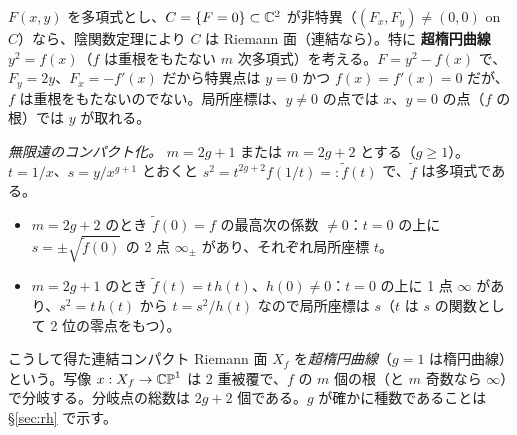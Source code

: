 \begin{ex}[平面曲線と超楕円曲線]\label{ex:hyper}
$F(x,y)$ を多項式とし、$C=\{F=0\}\subset\mathbb C^2$ が非特異（$(F_x,F_y)\ne(0,0)$ on $C$）なら、陰関数定理により $C$ は Riemann 面（連結なら）。特に \textbf{超楕円曲線} $y^2=f(x)$（$f$ は重根をもたない $m$ 次多項式）を考える。$F=y^2-f(x)$ で、$F_y=2y$、$F_x=-f'(x)$ だから特異点は $y=0$ かつ $f(x)=f'(x)=0$ だが、$f$ は重根をもたないのでない。局所座標は、$y\ne0$ の点では $x$、$y=0$ の点（$f$ の根）では $y$ が取れる。

\emph{無限遠のコンパクト化。} $m=2g+1$ または $m=2g+2$ とする（$g\ge1$）。$t=1/x$、$s=y/x^{g+1}$ とおくと $s^2=t^{2g+2}f(1/t)=:\tilde f(t)$ で、$\tilde f$ は多項式である。
\begin{itemize}
\item $m=2g+2$ のとき $\tilde f(0)=f$ の最高次の係数 $\ne0$：$t=0$ の上に $s=\pm\sqrt{\tilde f(0)}$ の 2 点 $\infty_\pm$ があり、それぞれ局所座標 $t$。
\item $m=2g+1$ のとき $\tilde f(t)=t\,h(t)$、$h(0)\ne0$：$t=0$ の上に 1 点 $\infty$ があり、$s^2=t\,h(t)$ から $t=s^2/h(t)$ なので局所座標は $s$（$t$ は $s$ の関数として 2 位の零点をもつ）。
\end{itemize}
こうして得た連結コンパクト Riemann 面 $X_f$ を\emph{超楕円曲線}（$g=1$ は楕円曲線）という。写像 $x:X_f\to\mathbb{CP}^1$ は 2 重被覆で、$f$ の $m$ 個の根（と $m$ 奇数なら $\infty$）で分岐する。分岐点の総数は $2g+2$ 個である。$g$ が確かに種数であることは \S\ref{sec:rh} で示す。
\end{ex}

